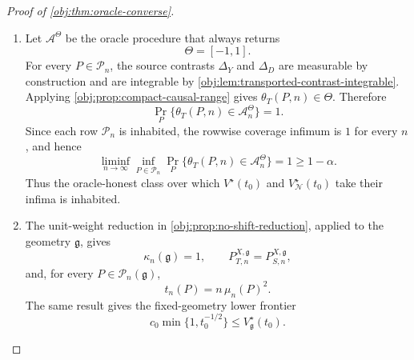 \documentclass[11pt]{article}
\begin{document}
\begin{proof}[Proof of \cref{obj:thm:oracle-converse}]
\begin{enumerate}
\item Let \(\mathcal A^\Theta\) be the oracle procedure that always returns
\[
  \Theta=[-1,1].
\]
For every \(P\in\mathcal P_n\), the source contrasts \(\Delta_Y\) and \(\Delta_D\) are
measurable by construction and are integrable by \cref{obj:lem:transported-contrast-integrable}.
Applying \cref{obj:prop:compact-causal-range} gives \(\theta_T(P,n)\in\Theta\). Therefore
\[
  \Pr_P\{\theta_T(P,n)\in\mathcal A^\Theta_n\}=1 .
\]
Since each row \(\mathcal P_n\) is inhabited, the rowwise coverage infimum is \(1\) for every
\(n\), and hence
\[
  \liminf_{n\to\infty}\inf_{P\in\mathcal P_n}
  \Pr_P\{\theta_T(P,n)\in\mathcal A^\Theta_n\}
  =
  1
  \ge 1-\alpha .
\]
Thus the oracle-honest class over which \(V^\star(t_0)\) and
\(V_{\mathcal N}^\star(t_0)\) take their infima is inhabited. %

\item The unit-weight reduction in \cref{obj:prop:no-shift-reduction}, applied to the
geometry \(\mathfrak g\), gives
\[
  \kappa_n(\mathfrak g)=1,
  \qquad
  P^{X,\mathfrak g}_{T,n}=P^{X,\mathfrak g}_{S,n},
\]
and, for every \(P\in\mathcal P_n(\mathfrak g)\),
\[
  t_n(P)
  =
  n\,\mu_n(P)^2 .
\]
The same result gives the fixed-geometry lower frontier
\[
  c_0\min\{1,t_0^{-1/2}\}
  \le
  V_{\mathfrak g}^\star(t_0).
\] %


\end{enumerate}
\end{proof}
\end{document}
